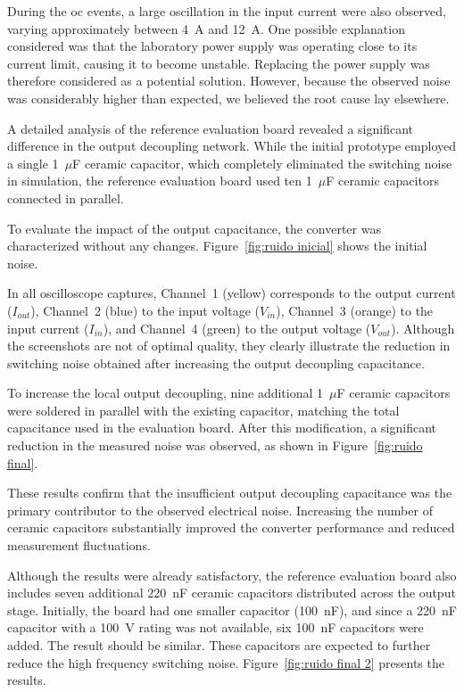         During the \ac{oc} events, a large oscillation in the input current were also observed, varying approximately between 4~A and 12~A. One possible explanation considered was that the laboratory power supply was operating close to its current limit, causing it to become unstable. Replacing the power supply was therefore considered as a potential solution. However, because the observed noise was considerably higher than expected, we believed the root cause lay elsewhere.

        A detailed analysis of the reference evaluation board revealed a significant difference in the output decoupling network. While the initial prototype employed a single 1~$\mu$F ceramic capacitor, which completely eliminated the switching noise in simulation, the reference evaluation board used ten 1~$\mu$F ceramic capacitors connected in parallel.

        To evaluate the impact of the output capacitance, the converter was characterized without any changes. Figure~\ref{fig:ruido inicial} shows the initial noise.

        In all oscilloscope captures, Channel~1 (yellow) corresponds to the output current ($I_{out}$), Channel~2 (blue) to the input voltage ($V_{in}$), Channel~3 (orange) to the input current ($I_{in}$), and Channel~4 (green) to the output voltage ($V_{out}$). Although the screenshots are not of optimal quality, they clearly illustrate the reduction in switching noise obtained after increasing the output decoupling capacitance.

        To increase the local output decoupling, nine additional 1~$\mu$F ceramic capacitors were soldered in parallel with the existing capacitor, matching the total capacitance used in the evaluation board. After this modification, a significant reduction in the measured noise was observed, as shown in Figure~\ref{fig:ruido final}.

        These results confirm that the insufficient output decoupling capacitance was the primary contributor to the observed electrical noise. Increasing the number of ceramic capacitors substantially improved the converter performance and reduced measurement fluctuations. 
        
        Although the results were already satisfactory, the reference evaluation board also includes seven additional 220~nF ceramic capacitors distributed across the output stage. Initially, the board had one smaller capacitor (100~nF), and since a 220~nF capacitor with a 100~V rating was not available, six 100~nF capacitors were added. The result should be similar. These capacitors are expected to further reduce the high frequency switching noise. Figure~\ref{fig:ruido final 2} presents the results.

